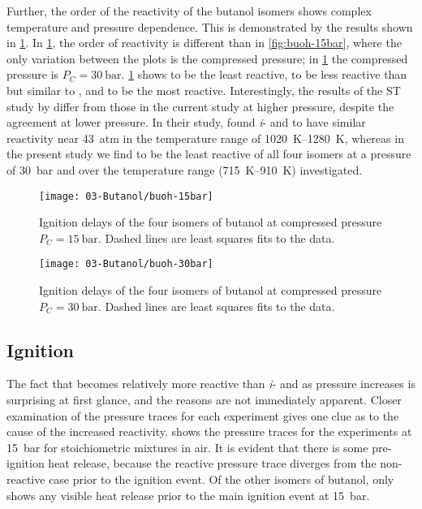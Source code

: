 \documentclass[../main.tex]{subfiles}
\begin{document}
Further, the order of the reactivity of the butanol isomers shows complex
temperature and pressure dependence. This is demonstrated by the results shown
in \cref{fig:buoh-30bar}. In \cref{fig:buoh-30bar}, the order of
reactivity is different than in \cref{fig:buoh-15bar}, where the only
variation between the plots is the compressed pressure; in
\cref{fig:buoh-30bar} the compressed pressure is $P_C=\SI{30}{\bar}$.
\cref{fig:buoh-30bar} shows \iBuOH{} to be the least reactive,
\sBuOH{} to be less reactive than but similar to \tBuOH{},
and \nBuOH{} to be the most reactive. Interestingly, the results of
the ST study by \textcite{Stranic2012} differ from those in the current
study at higher pressure, despite the agreement at lower pressure. In their
study, \textcite{Stranic2012} found \textit{i}- and \nBuOH{} to have
similar reactivity near \SI{43}{atm} in the temperature range of \SIrange{1020}{1280}{\kelvin},
whereas in the present study we find \iBuOH{} to be the least
reactive of all four isomers at a pressure of \SI{30}{\bar} and over the temperature
range (\SIrange{715}{910}{\kelvin}) investigated.

\begin{figure}
    \begin{floatrow}
    \ffigbox
        {\texttt{[image: 03-Butanol/buoh-15bar]}}
        {\caption{Ignition delays of the four isomers of butanol at compressed
            pressure $P_C=\SI{15}{\bar}$. Dashed lines are least squares fits to the
            data.}
        \label{fig:buoh-15bar}}
    \ffigbox
        {\texttt{[image: 03-Butanol/buoh-30bar]}}
        {\caption{Ignition delays of the four isomers of butanol at compressed
            pressure $P_C=\SI{30}{\bar}$. Dashed lines are least squares fits to the
            data.}
        \label{fig:buoh-30bar}}
    \end{floatrow}
\end{figure}

\subsection{\tBuOH{} Ignition}

The fact that \tBuOH{} becomes relatively more reactive than
\textit{i}- and \sBuOH{} as pressure increases is surprising at first
glance, and the reasons are not immediately apparent. Closer examination of the
pressure traces for each experiment gives one clue as to the cause of the
increased reactivity.  shows the pressure traces for
the \tBuOH{} experiments at \SI{15}{\bar} for stoichiometric mixtures in
air. It is evident that there is some pre-ignition heat release, because the
reactive pressure trace diverges from the non-reactive case prior to the
ignition event. Of the other isomers of butanol, only \nBuOH{} shows
any visible heat release prior to the main ignition event at \SI{15}{\bar}.
\end{document}
